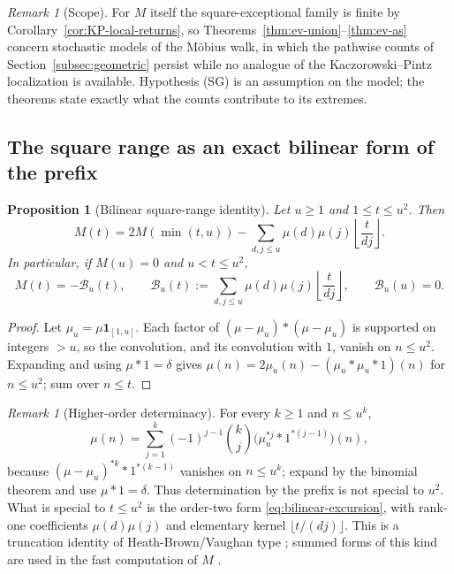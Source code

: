 \documentclass[11pt]{amsart}
\numberwithin{equation}{section}
\theoremstyle{plain}
\newtheorem{proposition}[theorem]{Proposition}
\theoremstyle{definition}
\theoremstyle{remark}
\newtheorem{remark}[theorem]{Remark}
\begin{document}
\begin{remark}[Scope]
\label{rem:ev-scope}
For $M$ itself the square-exceptional family is finite by
Corollary~\ref{cor:KP-local-returns}, so
Theorems~\ref{thm:ev-union}--\ref{thm:ev-as} concern stochastic models of
the M\"obius walk, in which the pathwise counts of
Section~\ref{subsec:geometric} persist while no analogue of the
Kaczorowski--Pintz localization is available. Hypothesis (SG) is an
assumption on the model; the theorems state exactly what the counts
contribute to its extremes.
\end{remark}

\subsection{The square range as an exact bilinear form of the prefix}

\begin{proposition}[Bilinear square-range identity]
\label{prop:prefix-bilinear}
Let $u\ge1$ and $1\le t\le u^2$. Then
\begin{equation}
\label{eq:bilinear-general}
M(t)=2M(\min(t,u))-
\sum_{d,j\le u}\mu(d)\mu(j)\left\lfloor\frac{t}{dj}\right\rfloor.
\end{equation}
In particular, if $M(u)=0$ and $u<t\le u^2$,
\begin{equation}
\label{eq:bilinear-excursion}
M(t)=-\mathcal B_u(t),\qquad
\mathcal B_u(t):=\sum_{d,j\le u}\mu(d)\mu(j)
\left\lfloor\frac{t}{dj}\right\rfloor,
\qquad \mathcal B_u(u)=0.
\end{equation}
\end{proposition}

\begin{proof}
Let $\mu_u=\mu\mathbf1_{[1,u]}$. Each factor of $(\mu-\mu_u)*(\mu-\mu_u)$ is
supported on integers $>u$, so the convolution, and its convolution with
$1$, vanish on $n\le u^2$. Expanding and using $\mu*1=\delta$ gives
$\mu(n)=2\mu_u(n)-(\mu_u*\mu_u*1)(n)$ for $n\le u^2$; sum over $n\le t$.
\end{proof}

\begin{remark}[Higher-order determinacy]
\label{rem:prefix-k}
For every $k\ge1$ and $n\le u^k$,
\begin{equation}
\label{eq:HB-k}
\mu(n)=\sum_{j=1}^{k}(-1)^{j-1}\binom{k}{j}
\bigl(\mu_u^{*j}*1^{*(j-1)}\bigr)(n),
\end{equation}
because $(\mu-\mu_u)^{*k}*1^{*(k-1)}$ vanishes on $n\le u^k$; expand by the
binomial theorem and use $\mu*1=\delta$. Thus determination by the prefix
is not special to $u^2$. What is special to $t\le u^2$ is the order-two form
\eqref{eq:bilinear-excursion}, with rank-one coefficients $\mu(d)\mu(j)$ and
elementary kernel $\lfloor t/(dj)\rfloor$. This is a truncation identity of
Heath-Brown/Vaughan type \cite{HB82}; summed forms of this kind are used in
the fast computation of $M$ \cite{HT23}.
\end{remark}
\end{document}
